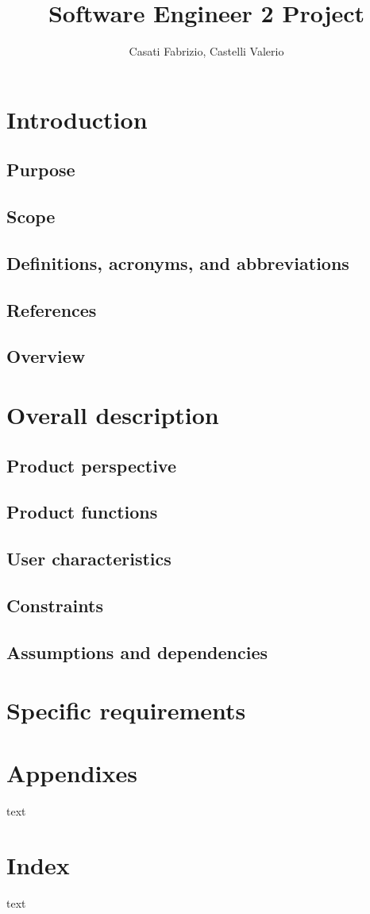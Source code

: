 \documentclass{scrbook}
\begin{document}
\title{Software Engineer 2 Project}
\author{Casati Fabrizio, Castelli Valerio}

\maketitle
\tableofcontents

\chapter{Introduction}
\section{Purpose}
\section{Scope}
\section{Definitions, acronyms, and abbreviations}
\section{References}
\section{Overview}

\chapter{Overall description}
\section{Product perspective}
\section{Product functions}
\section{User characteristics}
\section{Constraints}
\section{Assumptions and dependencies}

\chapter{Specific requirements}

\chapter*{Appendixes}
text

\chapter*{Index}
text
\end{document}
